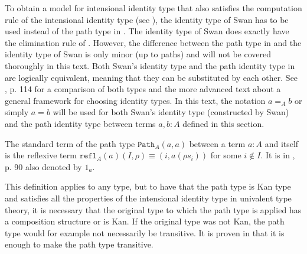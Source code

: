 \documentclass[12pt,a4paper,twoside,xetex]{book} %
\newcommand{\op}[1]{\mathtt{#1}}
\begin{document}
To obtain a model for intensional identity type that also satisfies the 
computation rule of the intensional identity type (see ), the 
identity type of Swan \cite{Swan2014} has to be used instead of the path type 
in . The identity type of Swan does exactly have the elimination 
rule of . However, the difference between the path type in 
 and the identity type of Swan is only minor (up to paths) and 
will not be covered thoroughly in this text. Both Swan's identity type and the 
path identity type in  are logically equivalent, meaning that 
they can be substituted by each other. See  \cite{Huber2016}, p. 114 for a 
comparison of both types and the more advanced text \cite{Swa18} about a 
general framework for choosing identity types. In this text, the notation $a 
=_A b$ or simply $a = b$ will be used for both Swan's identity type 
(constructed by Swan) and the path identity type between terms $a, b: A$ defined 
in this section. 

The standard term of the path type $\op{Path}_A(a,a)$ between a term $a : A$ 
and itself  is the reflexive term $\op{refl}_A(a)(I,\rho) \equiv (i, a(\rho 
s_i))$ for some $i \not \in I$. It is in \cite{Huber2016}, p. 90 also denoted 
by $1_a$.

This definition applies to any type, but to have that the path type is Kan type 
and satisfies all the properties of the intensional identity type in univalent 
type theory, it is necessary that the original type to which the path type is 
applied has a composition structure or is Kan. If the original type was not 
Kan, the path type would for example not necessarily be transitive. It is proven in  that it is enough to make the path type transitive.
\end{document}
